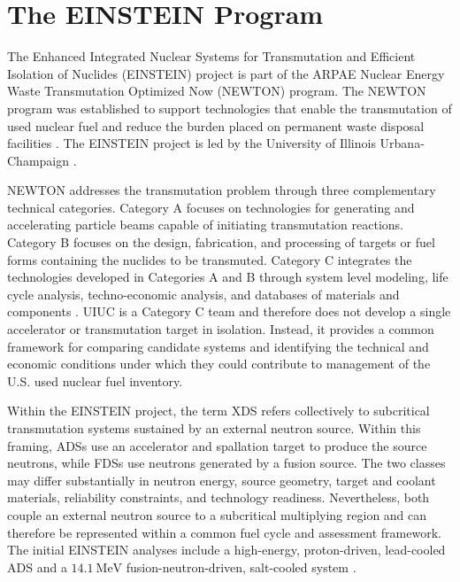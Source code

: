 \section{The EINSTEIN Program}
\label{sec:einstein}

The Enhanced Integrated Nuclear Systems for Transmutation and Efficient Isolation of Nuclides (\gls{EINSTEIN})
project is part of the \gls{ARPAE} Nuclear Energy Waste Transmutation Optimized Now (\gls{NEWTON}) program.
The \gls{NEWTON} program was established to support
technologies that enable the transmutation of used nuclear fuel and reduce
the burden placed on permanent waste disposal facilities
\cite{arpa_e_newton_2025}. The \gls{EINSTEIN} project is led by the University of Illinois Urbana-Champaign
\cite{arpa_e_einstein_2025}.

\gls{NEWTON} addresses the transmutation problem through three complementary
technical categories. Category A focuses on technologies for generating and
accelerating particle beams capable of initiating transmutation reactions.
Category B focuses on the design, fabrication, and processing of targets or
fuel forms containing the nuclides to be transmuted. Category C integrates
the technologies developed in Categories A and B through system level
modeling, life cycle analysis, techno-economic analysis, and databases of
materials and components
\cite{arpa_e_newton_2025,doe_categories}. \gls{UIUC} is a Category C team and therefore
does not develop a single accelerator or transmutation target in isolation.
Instead, it provides a common framework for comparing candidate systems and
identifying the technical and economic conditions under which they could
contribute to management of the U.S. used nuclear fuel inventory.

Within the \gls{EINSTEIN} project, the term \acrshort{XDS} refers collectively
to subcritical transmutation systems sustained by an external neutron source.
Within this framing, \glspl{ADS} use an accelerator and spallation target to
produce the source neutrons, while \glspl{FDS} use neutrons generated by a
fusion source. The two classes may differ substantially in neutron energy,
source geometry, target and coolant materials, reliability constraints, and
technology readiness. Nevertheless, both couple an external neutron source to
a subcritical multiplying region and can therefore be represented within a
common fuel cycle and assessment framework. The initial \gls{EINSTEIN} analyses
include a high-energy, proton-driven, lead-cooled \gls{ADS} and a
\(14.1~\mathrm{MeV}\) fusion-neutron-driven, salt-cooled system
\cite{fang_einstein_2025}.

